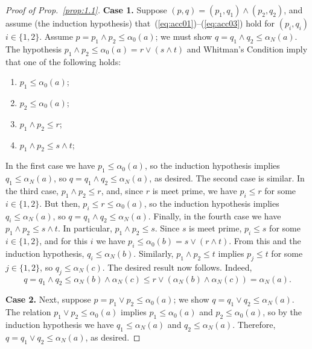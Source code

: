 \begin{proof}[Proof of Prop.~\ref{prop:1.1}]
    \medskip
    \noindent \textbf{Case 1.}
    Suppose $(p,q) = (p_1, q_1) \wedge (p_2, q_2)$, and assume (the induction hypothesis) 
    that~(\ref{eq:acc01})--(\ref{eq:acc03}) hold for
    $(p_i,q_i)$ $i\in \{1,2\}$.
    Assume $p = p_1\wedge p_2 \leq \alpha_0(a)$; we must show 
    $q=q_1\wedge q_2 \leq \alpha_N(a)$.
    The hypothesis $p_1\wedge p_2 \leq \alpha_0(a) = r\vee (s \wedge t)$ and
    Whitman's Condition imply that one of the following holds:
    \begin{enumerate}
      \item   $p_1\leq \alpha_0(a)$;  
      \item   $p_2\leq \alpha_0(a)$;  
      \item   $p_1\wedge p_2\leq r$;  
      \item   $p_1\wedge p_2 \leq s \wedge t$;  
    \end{enumerate}
    In the first case we have $p_1\leq \alpha_0(a)$, so
    the induction hypothesis implies $q_1\leq \alpha_N(a)$, so 
    $q = q_1\wedge q_2\leq \alpha_N(a)$, as desired.  
    The second case is similar.
    In the third case, $p_1 \wedge p_2 \leq r$, and, since $r$ is meet prime, we have
    $p_i\leq r$ for some $i\in \{1,2\}$.  
    But then, $p_i \leq r \leq \alpha_0(a)$, so 
    the induction hypothesis implies $q_i \leq \alpha_N(a)$, so 
    $q = q_1\wedge q_2\leq \alpha_N(a)$.
    Finally, in the fourth case we have $p_1\wedge p_2 \leq s \wedge t$. 
    In particular, $p_1\wedge p_2 \leq s$. Since $s$ is meet prime,
    $p_i\leq s$ for some $i\in \{1,2\}$,  
    and for this $i$ we have $p_i \leq \alpha_0(b) = s\vee (r\wedge t)$.
    From this and the induction hypothesis, $q_i \leq \alpha_N(b)$.
    Similarly, $p_1\wedge p_2 \leq t$ implies 
    $p_j\leq t$ for some $j\in \{1,2\}$, so $q_j \leq \alpha_N(c)$.
    The desired result now follows. Indeed,
    \[
    q = q_1\wedge q_2 \leq \alpha_N(b) \wedge \alpha_N(c) 
    \leq r \vee (\alpha_N(b)\wedge \alpha_N(c)) = \alpha_N(a).
    \] 
  
    \medskip
    \noindent \textbf{Case 2.}
    Next, suppose $p = p_1\vee p_2 \leq \alpha_0(a)$; we show 
    $q = q_1 \vee q_2 \leq \alpha_N(a)$. 
    The relation $p_1\vee p_2 \leq \alpha_0(a)$ implies 
    $p_1\leq \alpha_0(a)$ and $p_2\leq \alpha_0(a)$, 
    so by the induction hypothesis we have 
    $q_1\leq \alpha_N(a)$ and $q_2\leq \alpha_N(a)$.  
    Therefore, $q = q_1 \vee q_2 \leq \alpha_N(a)$, as desired.


\end{proof}
